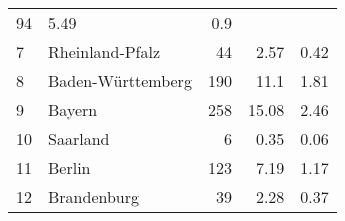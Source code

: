 \begin{longtable}{lXrrr}
       \num{94} &
       \num[round-mode=places,round-precision=2]{5.49} &
         \num[round-mode=places,round-precision=2]{0.9} \\

     7 &
     \multicolumn{1}{X}{ Rheinland-Pfalz   } &


       \num{44} &
       \num[round-mode=places,round-precision=2]{2.57} &
         \num[round-mode=places,round-precision=2]{0.42} \\

     8 &
     \multicolumn{1}{X}{ Baden-Württemberg   } &


       \num{190} &
       \num[round-mode=places,round-precision=2]{11.1} &
         \num[round-mode=places,round-precision=2]{1.81} \\

     9 &
     \multicolumn{1}{X}{ Bayern   } &


       \num{258} &
       \num[round-mode=places,round-precision=2]{15.08} &
         \num[round-mode=places,round-precision=2]{2.46} \\

     10 &
     \multicolumn{1}{X}{ Saarland   } &


       \num{6} &
       \num[round-mode=places,round-precision=2]{0.35} &
         \num[round-mode=places,round-precision=2]{0.06} \\

     11 &
     \multicolumn{1}{X}{ Berlin   } &


       \num{123} &
       \num[round-mode=places,round-precision=2]{7.19} &
         \num[round-mode=places,round-precision=2]{1.17} \\

     12 &
     \multicolumn{1}{X}{ Brandenburg   } &


       \num{39} &
       \num[round-mode=places,round-precision=2]{2.28} &
         \num[round-mode=places,round-precision=2]{0.37} \\


\end{longtable}
